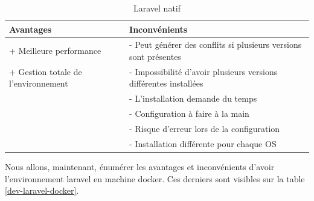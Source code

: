 \documentclass[
    iai, %
    il, %
]{heig-tb}
\begin{document}
\begin{table}[h]
    \begin{center}
        \caption{Laravel natif \label{dev-laravel-native}}
        \begin{tabularx}{1.0\textwidth} {X|X}
            Avantages                           & Inconvénients
            \\ \hline
            + Meilleure performance             & - Peut générer des conflits si plusieurs versions sont présentes \\
            + Gestion totale de l'environnement & - Impossibilité d'avoir plusieurs versions différentes
            installées                                                                                             \\
                                                & - L'installation demande du temps                                \\
                                                & - Configuration à faire à la main                                \\
                                                & - Risque d'erreur lors de la configuration                       \\
                                                & - Installation différente pour chaque OS                         \\
        \end{tabularx}
    \end{center}
\end{table}

Nous allons, maintenant, énumérer les avantages et inconvénients d'avoir l'environnement \Gls{laravel} en
machine \Gls{docker}. Ces derniers sont visibles sur la table \ref{dev-laravel-docker}.
\end{document}
